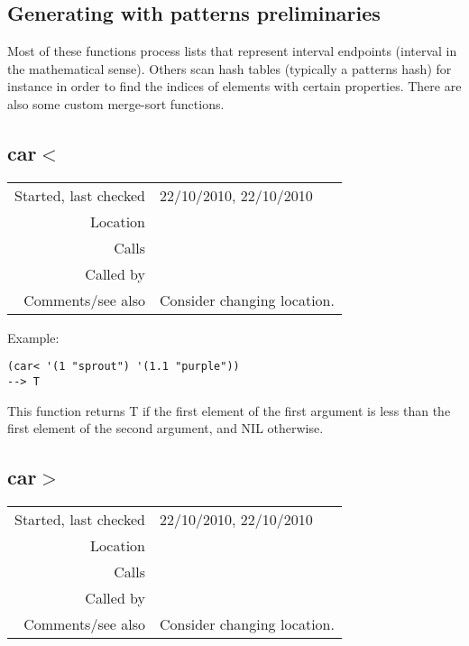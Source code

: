 \subsection{Generating with patterns preliminaries}\label{sec:generating-with-patterns-preliminaries}

Most of these functions process lists that represent
interval endpoints (interval in the mathematical
sense). Others scan hash tables (typically a patterns
hash) for instance in order to find the indices of
elements with certain properties. There are also
some custom merge-sort functions.


\subsection*{car$<$}\label{fun:car<}

\vspace{0.3cm}
\begin{tabular}{r|p{8cm}}
Started, last checked & 22/10/2010, 22/10/2010 \\
Location & \nameref{sec:generating-with-patterns-preliminaries} \\
Calls & \\
Called by & \nameref{fun:merge-sort-by-car<} \\
Comments/see also & Consider changing location.
\end{tabular}

\vspace{0.5cm}
\noindent Example:
\begin{verbatim}
(car< '(1 "sprout") '(1.1 "purple"))
--> T
\end{verbatim}

\noindent This function returns T if the first
element of the first argument is less than the first
element of the second argument, and NIL otherwise.


\subsection*{car$>$}\label{fun:car>}

\vspace{0.3cm}
\begin{tabular}{r|p{8cm}}
Started, last checked & 22/10/2010, 22/10/2010 \\
Location & \nameref{sec:generating-with-patterns-preliminaries} \\
Calls & \\
Called by & \nameref{fun:merge-sort-by-car>} \\
Comments/see also & Consider changing location.
\end{tabular}


